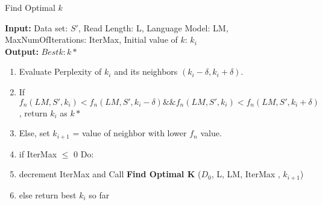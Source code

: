 \begin{minipage}[t]{.45\textwidth}
\begin{algorithm} [H]
\caption{Find Optimal $k$}
\begin{flushleft}
\textbf{Input:} Data set: $S'$, Read Length: L, Language Model: LM, MaxNumOfIterations: IterMax, Initial value of $k$: $k_i$  \\
\textbf{Output:} $Best k: k*$
\end{flushleft}

\begin{algorithmic} 
\begin{flushleft}
\begin{enumerate}
\itemsep0em
\item %
Evaluate Perplexity of $k_i$ and its neighbors $(k_i-\delta, k_i+\delta)$.
\item If $f_n(LM,S',k_i) < f_n(LM,S',k_i-\delta) \&\& f_n(LM,S',k_i) < f_n(LM,S',k_i+\delta)$, return $k_i$ as $k*$
\item Else, set $k_{i+1}$ = value of neighbor with lower $f_n$ value.
\item if IterMax $\leq$ 0 Do:
\item \quad decrement IterMax and Call \textbf{Find Optimal K} ($D_{0}$, L, LM, IterMax , $k_{i+1}$)
\item else  \quad return best $k_i$ so far
\end{enumerate}%
\end{flushleft}
\end{algorithmic}
\end{algorithm}

\end{minipage}

